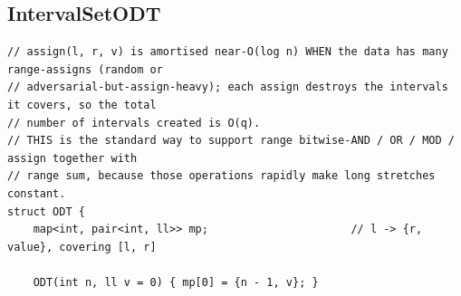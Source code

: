 \documentclass[9pt,a4paper,twocolumn]{extarticle}
\begin{document}
\filbreak
\subsection{IntervalSetODT}
\nopagebreak
\begin{lstlisting}
// assign(l, r, v) is amortised near-O(log n) WHEN the data has many range-assigns (random or
// adversarial-but-assign-heavy); each assign destroys the intervals it covers, so the total
// number of intervals created is O(q).
// THIS is the standard way to support range bitwise-AND / OR / MOD / assign together with
// range sum, because those operations rapidly make long stretches constant.
struct ODT {
    map<int, pair<int, ll>> mp;                      // l -> {r, value}, covering [l, r]

    ODT(int n, ll v = 0) { mp[0] = {n - 1, v}; }


\end{lstlisting}
\end{document}
